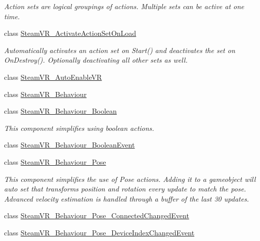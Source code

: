 \begin{DoxyCompactItemize}
\begin{DoxyCompactList}\small\item\em Action sets are logical groupings of actions. Multiple sets can be active at one time. \end{DoxyCompactList}\item 
class \mbox{\hyperlink{class_valve_1_1_v_r_1_1_steam_v_r___activate_action_set_on_load}{Steam\+V\+R\+\_\+\+Activate\+Action\+Set\+On\+Load}}
\begin{DoxyCompactList}\small\item\em Automatically activates an action set on Start() and deactivates the set on On\+Destroy(). Optionally deactivating all other sets as well. \end{DoxyCompactList}\item 
class \mbox{\hyperlink{class_valve_1_1_v_r_1_1_steam_v_r___auto_enable_v_r}{Steam\+V\+R\+\_\+\+Auto\+Enable\+VR}}
\item 
class \mbox{\hyperlink{class_valve_1_1_v_r_1_1_steam_v_r___behaviour}{Steam\+V\+R\+\_\+\+Behaviour}}
\item 
class \mbox{\hyperlink{class_valve_1_1_v_r_1_1_steam_v_r___behaviour___boolean}{Steam\+V\+R\+\_\+\+Behaviour\+\_\+\+Boolean}}
\begin{DoxyCompactList}\small\item\em This component simplifies using boolean actions. \end{DoxyCompactList}\item 
class \mbox{\hyperlink{class_valve_1_1_v_r_1_1_steam_v_r___behaviour___boolean_event}{Steam\+V\+R\+\_\+\+Behaviour\+\_\+\+Boolean\+Event}}
\item 
class \mbox{\hyperlink{class_valve_1_1_v_r_1_1_steam_v_r___behaviour___pose}{Steam\+V\+R\+\_\+\+Behaviour\+\_\+\+Pose}}
\begin{DoxyCompactList}\small\item\em This component simplifies the use of Pose actions. Adding it to a gameobject will auto set that transform\textquotesingle{}s position and rotation every update to match the pose. Advanced velocity estimation is handled through a buffer of the last 30 updates. \end{DoxyCompactList}\item 
class \mbox{\hyperlink{class_valve_1_1_v_r_1_1_steam_v_r___behaviour___pose___connected_changed_event}{Steam\+V\+R\+\_\+\+Behaviour\+\_\+\+Pose\+\_\+\+Connected\+Changed\+Event}}
\item 
class \mbox{\hyperlink{class_valve_1_1_v_r_1_1_steam_v_r___behaviour___pose___device_index_changed_event}{Steam\+V\+R\+\_\+\+Behaviour\+\_\+\+Pose\+\_\+\+Device\+Index\+Changed\+Event}}

\end{DoxyCompactItemize}
